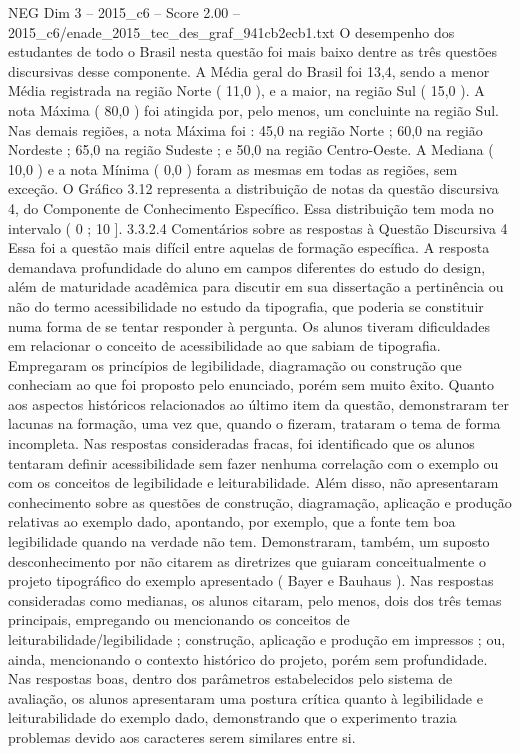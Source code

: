 \begin{textsample}{NEG Dim 3 – 2015\_c6 – Score 2.00 – 2015\_c6/enade\_2015\_tec\_des\_graf\_941cb2ecb1.txt}
O desempenho dos estudantes de todo o Brasil nesta questão foi mais baixo dentre as três questões discursivas desse componente.
A Média geral do Brasil foi 13,4, sendo a menor Média registrada na região Norte ( 11,0 ), e a maior, na região Sul ( 15,0 ).
A nota Máxima ( 80,0 ) foi atingida por, pelo menos, um concluinte na região Sul.
Nas demais regiões, a nota Máxima foi : 45,0 na região Norte ; 60,0 na região Nordeste ; 65,0 na região Sudeste ; e 50,0 na região Centro-Oeste.
A Mediana ( 10,0 ) e a nota Mínima ( 0,0 ) foram as mesmas em todas as regiões, sem exceção.
O Gráfico 3.12 representa a distribuição de notas da questão discursiva 4, do Componente de Conhecimento Específico.
Essa distribuição tem moda no intervalo ( 0 ; 10 ]. 3.3.2.4 Comentários sobre as respostas à Questão Discursiva 4 Essa foi a questão mais difícil entre aquelas de formação específica.
A resposta demandava profundidade do aluno em campos diferentes do estudo do design, além de maturidade acadêmica para discutir em sua dissertação a pertinência ou não do termo acessibilidade no estudo da tipografia, que poderia se constituir numa forma de se tentar responder à pergunta.
Os alunos tiveram dificuldades em relacionar o conceito de acessibilidade ao que sabiam de tipografia.
Empregaram os princípios de legibilidade, diagramação ou construção que conheciam ao que foi proposto pelo enunciado, porém sem muito êxito.
Quanto aos aspectos históricos relacionados ao último item da questão, demonstraram ter lacunas na formação, uma vez que, quando o fizeram, trataram o tema de forma incompleta.
Nas respostas consideradas fracas, foi identificado que os alunos tentaram definir acessibilidade sem fazer nenhuma correlação com o exemplo ou com os conceitos de legibilidade e leiturabilidade.
Além disso, não apresentaram conhecimento sobre as questões de construção, diagramação, aplicação e produção relativas ao exemplo dado, apontando, por exemplo, que a fonte tem boa legibilidade quando na verdade não tem.
Demonstraram, também, um suposto desconhecimento por não citarem as diretrizes que guiaram conceitualmente o projeto tipográfico do exemplo apresentado ( Bayer e Bauhaus ).
Nas respostas consideradas como medianas, os alunos citaram, pelo menos, dois dos três temas principais, empregando ou mencionando os conceitos de leiturabilidade/legibilidade ; construção, aplicação e produção em impressos ; ou, ainda, mencionando o contexto histórico do projeto, porém sem profundidade.
Nas respostas boas, dentro dos parâmetros estabelecidos pelo sistema de avaliação, os alunos apresentaram uma postura crítica quanto à legibilidade e leiturabilidade do exemplo dado, demonstrando que o experimento trazia problemas devido aos caracteres serem similares entre si.

\end{textsample}
